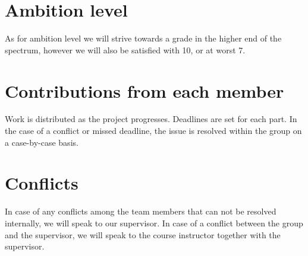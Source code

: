 \documentclass[11pt]{article}
\begin{document}
\section{Ambition level}

As for ambition level we will strive towards a grade in the higher end of the spectrum, however we will also be satisfied with 10, or at worst 7.

\section{Contributions from each member}

Work is distributed as the project progresses. Deadlines are set for each part. In the case of a conflict or missed deadline, the issue is resolved within the group on a case-by-case basis.

\section{Conflicts}
In case of any conflicts among the team members that can not be resolved internally, we will speak to our supervisor. In case of a conflict between the group and the supervisor, we will speak to the course instructor together with the supervisor.
\end{document}
